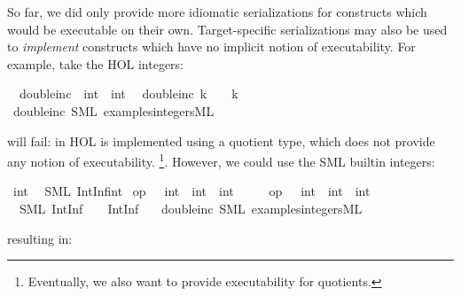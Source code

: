 \begin{isabellebody}
\begin{isamarkuptext}
  So far, we did only provide more idiomatic serializations for
  constructs which would be executable on their own.  Target-specific
  serializations may also be used to \emph{implement} constructs
  which have no implicit notion of executability.  For example,
  take the HOL integers:%
\end{isamarkuptext}%
\isamarkuptrue%
\isamarkupfalse%
\isanewline
\ \ double{\isacharunderscore}inc\ {\isacharcolon}{\isacharcolon}\ {\isachardoublequoteopen}int\ {\isasymRightarrow}\ int{\isachardoublequoteclose}\isanewline
\ \ {\isachardoublequoteopen}double{\isacharunderscore}inc\ k\ {\isacharequal}\ {}\ {\isacharasterisk}\ k\ {\isacharplus}\ {}{\isachardoublequoteclose}\isanewline
\isanewline
{}\isamarkupfalse%
\ double{\isacharunderscore}inc\ {\isacharparenleft}SML\ {\isachardoublequoteopen}examples{\isacharslash}integers{\isachardot}ML{\isachardoublequoteclose}{\isacharparenright}%
\begin{isamarkuptext}%
will fail:  in HOL is implemented using a quotient
  type, which does not provide any notion of executability.
  \footnote{Eventually, we also want to provide executability
  for quotients.}.  However, we could use the SML builtin
  integers:%
\end{isamarkuptext}%
\isamarkuptrue%
\isamarkupfalse%
\ int\isanewline
\ \ {\isacharparenleft}SML\ {\isachardoublequoteopen}IntInf{\isachardot}int{\isachardoublequoteclose}{\isacharparenright}\isanewline
\isanewline
{}\isamarkupfalse%
\ {\isachardoublequoteopen}op\ {\isacharplus}\ {\isasymColon}\ int\ {\isasymRightarrow}\ int\ {\isasymRightarrow}\ int{\isachardoublequoteclose}\isanewline
\ \ \ \ \ {\isachardoublequoteopen}op\ {\isacharasterisk}\ {\isasymColon}\ int\ {\isasymRightarrow}\ int\ {\isasymRightarrow}\ int{\isachardoublequoteclose}\isanewline
\ \ {\isacharparenleft}SML\ {\isachardoublequoteopen}IntInf{\isachardot}{\isacharplus}\ {\isacharparenleft}{\isacharunderscore}{\isacharcomma}\ {\isacharunderscore}{\isacharparenright}{\isachardoublequoteclose}\ \ {\isachardoublequoteopen}IntInf{\isachardot}{\isacharasterisk}\ {\isacharparenleft}{\isacharunderscore}{\isacharcomma}\ {\isacharunderscore}{\isacharparenright}{\isachardoublequoteclose}{\isacharparenright}\isanewline
\isanewline
{}\isamarkupfalse%
\ double{\isacharunderscore}inc\ {\isacharparenleft}SML\ {\isachardoublequoteopen}examples{\isacharslash}integers{\isachardot}ML{\isachardoublequoteclose}{\isacharparenright}%
\begin{isamarkuptext}%
resulting in:


\end{isamarkuptext}
\end{isabellebody}
